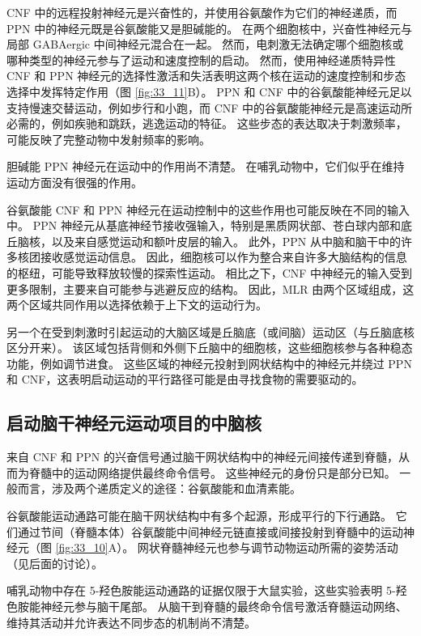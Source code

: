 CNF 中的远程投射神经元是兴奋性的，并使用谷氨酸作为它们的神经递质，而 PPN 中的神经元既是谷氨酸能又是胆碱能的。
在两个细胞核中，兴奋性神经元与局部 GABAergic 中间神经元混合在一起。
然而，电刺激无法确定哪个细胞核或哪种类型的神经元参与了运动和速度控制的启动。
然而，使用神经递质特异性 CNF 和 PPN 神经元的选择性激活和失活表明这两个核在运动的速度控制和步态选择中发挥特定作用（图 \ref{fig:33_11}B）。
PPN 和 CNF 中的谷氨酸能神经元足以支持慢速交替运动，例如步行和小跑，而 CNF 中的谷氨酸能神经元是高速运动所必需的，例如疾驰和跳跃，逃逸运动的特征。
这些步态的表达取决于刺激频率，可能反映了完整动物中发射频率的影响。


胆碱能 PPN 神经元在运动中的作用尚不清楚。 在哺乳动物中，它们似乎在维持运动方面没有很强的作用。


谷氨酸能 CNF 和 PPN 神经元在运动控制中的这些作用也可能反映在不同的输入中。
PPN 神经元从基底神经节接收强输入，特别是黑质网状部、苍白球内部和底丘脑核，以及来自感觉运动和额叶皮层的输入。
此外，PPN 从中脑和脑干中的许多核团接收感觉运动信息。
因此，细胞核可以作为整合来自许多大脑结构的信息的枢纽，可能导致释放较慢的探索性运动。
相比之下，CNF 中神经元的输入受到更多限制，主要来自可能参与逃避反应的结构。
因此，MLR 由两个区域组成，这两个区域共同作用以选择依赖于上下文的运动行为。


另一个在受到刺激时引起运动的大脑区域是丘脑底（或间脑）运动区（与丘脑底核区分开来）。
该区域包括背侧和外侧下丘脑中的细胞核，这些细胞核参与各种稳态功能，例如调节进食。
这些区域的神经元投射到网状结构中的神经元并绕过 PPN 和 CNF，这表明启动运动的平行路径可能是由寻找食物的需要驱动的。


\subsection{启动脑干神经元运动项目的中脑核}

来自 CNF 和 PPN 的兴奋信号通过脑干网状结构中的神经元间接传递到脊髓，从而为脊髓中的运动网络提供最终命令信号。
这些神经元的身份只是部分已知。
一般而言，涉及两个递质定义的途径：谷氨酸能和血清素能。


谷氨酸能运动通路可能在脑干网状结构中有多个起源，形成平行的下行通路。
它们通过节间（脊髓本体）谷氨酸能中间神经元链直接或间接投射到脊髓中的运动神经元（图 \ref{fig:33_10}A）。
网状脊髓神经元也参与调节动物运动所需的姿势活动（见后面的讨论）。


哺乳动物中存在 5-羟色胺能运动通路的证据仅限于大鼠实验，这些实验表明 5-羟色胺能神经元参与脑干尾部。
从脑干到脊髓的最终命令信号激活脊髓运动网络、维持其活动并允许表达不同步态的机制尚不清楚。


